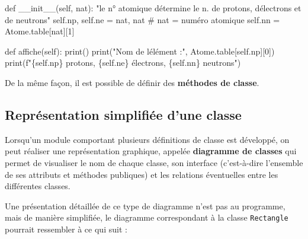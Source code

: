 \documentclass[
  letterpaper,
  DIV=11,
  numbers=noendperiod]{scrartcl}
\newenvironment{Shaded}{\begin{snugshade}}{\end{snugshade}}
\newcommand{\BuiltInTok}[1]{\textcolor[rgb]{0.00,0.23,0.31}{#1}}
\newcommand{\CommentTok}[1]{\textcolor[rgb]{0.37,0.37,0.37}{#1}}
\newcommand{\DecValTok}[1]{\textcolor[rgb]{0.68,0.00,0.00}{#1}}
\newcommand{\FunctionTok}[1]{\textcolor[rgb]{0.28,0.35,0.67}{#1}}
\newcommand{\KeywordTok}[1]{\textcolor[rgb]{0.00,0.23,0.31}{#1}}
\newcommand{\NormalTok}[1]{\textcolor[rgb]{0.00,0.23,0.31}{#1}}
\newcommand{\OperatorTok}[1]{\textcolor[rgb]{0.37,0.37,0.37}{#1}}
\newcommand{\SpecialCharTok}[1]{\textcolor[rgb]{0.37,0.37,0.37}{#1}}
\newcommand{\SpecialStringTok}[1]{\textcolor[rgb]{0.13,0.47,0.30}{#1}}
\newcommand{\StringTok}[1]{\textcolor[rgb]{0.13,0.47,0.30}{#1}}
\newcommand{\VariableTok}[1]{\textcolor[rgb]{0.07,0.07,0.07}{#1}}
\begin{document}
\begin{tcolorbox}
\begin{Shaded}
\begin{Highlighting}[]
\KeywordTok{def} \FunctionTok{\_\_init\_\_}\NormalTok{(}\VariableTok{self}\NormalTok{, nat):}
    \CommentTok{"le n° atomique détermine le n. de protons, d\textquotesingle{}électrons et de neutrons"}
    \VariableTok{self}\NormalTok{.np, }\VariableTok{self}\NormalTok{.ne }\OperatorTok{=}\NormalTok{ nat, nat  }\CommentTok{\# nat = numéro atomique}
    \VariableTok{self}\NormalTok{.nn }\OperatorTok{=}\NormalTok{ Atome.table[nat][}\DecValTok{1}\NormalTok{]}

\KeywordTok{def}\NormalTok{ affiche(}\VariableTok{self}\NormalTok{):}
    \BuiltInTok{print}\NormalTok{()}
    \BuiltInTok{print}\NormalTok{(}\StringTok{"Nom de l\textquotesingle{}élément :"}\NormalTok{, Atome.table[}\VariableTok{self}\NormalTok{.np][}\DecValTok{0}\NormalTok{])}
    \BuiltInTok{print}\NormalTok{(}\SpecialStringTok{f"}\SpecialCharTok{\{}\VariableTok{self}\SpecialCharTok{.}\NormalTok{np}\SpecialCharTok{\}}\SpecialStringTok{ protons, }\SpecialCharTok{\{}\VariableTok{self}\SpecialCharTok{.}\NormalTok{ne}\SpecialCharTok{\}}\SpecialStringTok{ électrons, }\SpecialCharTok{\{}\VariableTok{self}\SpecialCharTok{.}\NormalTok{nn}\SpecialCharTok{\}}\SpecialStringTok{ neutrons"}\NormalTok{)}
\end{Highlighting}
\end{Shaded}

De la même façon, il est possible de définir des \textbf{méthodes de
classe}.

\end{tcolorbox}

\hypertarget{repruxe9sentation-simplifiuxe9e-dune-classe}{%
\subsection{Représentation simplifiée d'une
classe}\label{repruxe9sentation-simplifiuxe9e-dune-classe}}

Lorsqu'un module comportant plusieurs définitions de classe est
développé, on peut réaliser une représentation graphique, appelée
\textbf{diagramme de classes} qui permet de visualiser le nom de chaque
classe, son interface (c'est-à-dire l'ensemble de ses attributs et
méthodes publiques) et les relations éventuelles entre les différentes
classes.

Une présentation détaillée de ce type de diagramme n'est pas au
programme, mais de manière simplifiée, le diagramme correspondant à la
classe \texttt{Rectangle} pourrait ressembler à ce qui suit :
\end{document}
